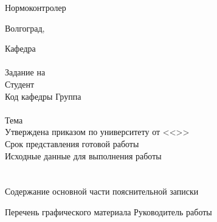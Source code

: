 {    Нормоконтролер 
    \hfill
    \\
    \vspace{\fill}
    \begin{center}
    Волгоград,~\the\year
    \end{center}
    \clearpage
    \thispagestyle{empty}
    \begin{center}
    \VSTUTitleHeading
    \end{center}
    Кафедра~\uline{\VSTUDepartment\hfill}\\
    \vfill
    \hfill\VSTUTitleHeadApproval
    \vspace{\fill}
    \\Задание на \\
    Студент \\
    Код кафедры \uline{\makebox[4cm]{\VSTUDepartmentCode}} \hfill Группа \uline{\makebox[4cm]{\VSTUStudentGroup}}\\
    \vspace{1mm}\\
    Тема \VSTUTitleUL\\
    Утверждена приказом по университету от <<\uline{\makebox[0.5cm]{\VSTUOrderDate}}>> \uline{\makebox[1.8cm]{\VSTUOrderMonth}} \uline{\makebox[1.2cm]{\VSTUOrderYear}} \textnumero\uline{\makebox[2cm]{\VSTUOrderNumber}}\\
    Срок представления готовой работы \\
    Исходные данные для выполнения работы\\
    \VSTUInitialDataUL\\
    \vspace{4mm}\\
    Содержание основной части пояснительной записки
    {\small
    \VSTUPZContents
    }
    \thispagestyle{empty}
    \addtocounter{page}{-1}
    \noindent Перечень графического материала
    {\small
    \VSTUPZGraphics
    }
    \vspace{\fill}
    \thispagestyle{empty}
    \noindent Руководитель работы 
    \hfill
    \\\\
}
